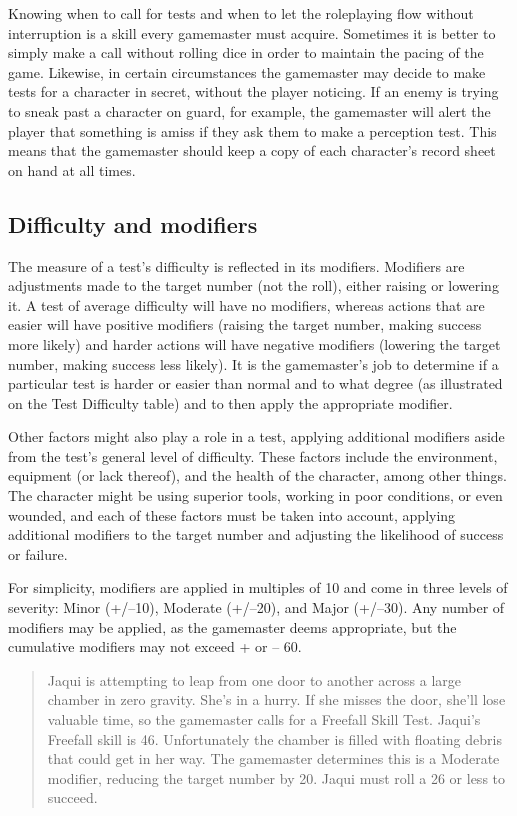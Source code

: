 Knowing when to call for tests and when to let the roleplaying flow without interruption is a skill every gamemaster must acquire. Sometimes it is better to simply make a call without rolling dice in order to maintain the pacing of the game. Likewise, in certain circumstances the gamemaster may decide to make tests for a character in secret, without the player noticing. If an enemy is trying to sneak past a character on guard, for example, the gamemaster will alert the player that something is amiss if they ask them to make a perception test. This means that the gamemaster should keep a copy of each character's record sheet on hand at all times.

\subsection{Difficulty and modifiers}
\label{sec:difficulty-modifiers}

The measure of a test's difficulty is reflected in its modifiers. Modifiers are adjustments made to the target number (not the roll), either raising or lowering it. A test of average difficulty will have no modifiers, whereas actions that are easier will have positive modifiers (raising the target number, making success more likely) and harder actions will have negative modifiers (lowering the target number, making success less likely). It is the gamemaster's job to determine if a particular test is harder or easier than normal and to what degree (as illustrated on the Test Difficulty table) and to then apply the appropriate modifier.

Other factors might also play a role in a test, applying additional modifiers aside from the test's general level of difficulty. These factors include the environment, equipment (or lack thereof), and the health of the character, among other things. The character might be using superior tools, working in poor conditions, or even wounded, and each of these factors must be taken into account, applying additional modifiers to the target number and adjusting the likelihood of success or failure.

For simplicity, modifiers are applied in multiples of 10 and come in three levels of severity: Minor (+/–10), Moderate (+/–20), and Major (+/–30). Any number of modifiers may be applied, as the gamemaster deems appropriate, but the cumulative modifiers may not exceed + or – 60.

\begin{quotation}
Jaqui is attempting to leap from one door to another across a large chamber in zero gravity. She's in a hurry. If she misses the door, she'll lose valuable time, so the gamemaster calls for a Freefall Skill Test. Jaqui's Freefall skill is 46. Unfortunately the chamber is filled with floating debris that could get in her way. The gamemaster determines this is a Moderate modifier, reducing the target number by 20. Jaqui must roll a 26 or less to succeed.
\end{quotation}

